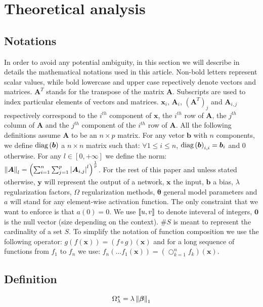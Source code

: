 \section{Theoretical analysis}

\subsection{Notations}

\par In order to avoid any potential ambiguity, in this section we will
describe in details the mathematical notations used in this article. Non-bold
letters represent scalar values, while bold lowercase and upper case
repectively denote vectors and matrices. $\bm{A}^T$ stands for the transpose of
the matrix $\bm{A}$. Subscripts are used to index particular elements of
vectors and matrices. $\bm{x}_i$, $\bm{A}_i$, $\left(\bm{A}^T\right)_j$ and
$\bm{A}_{i,j}$ respectively correspond to the $i^{th}$ component of $\bm{x}$,
the $i^{th}$ row of $\bm{A}$, the $j^{th}$ column of $\bm{A}$ and the $j^{th}$
component of the $i^{th}$ row of $\bm{A}$. All the following definitions assume
$\bm{A}$ to be an $n\times p$ matrix.  For any vetor $\bm{b}$ with $n$
components, we define $\text{diag}\left(\bm{b}\right)$ a $n\times n$ matrix such that: $\forall
1 \leq i \leq n$, $\text{diag}\left(\bm{b}\right)_{i, i} = \bm{b}_i$ and $0$ otherwise.  For any $l \in \left[0, +\infty\right]$ we define the norm: $\left\lVert\bm{A}\right\rVert_l =
\left(\sum_{i=1}^n \sum_{j=1}^p \left|\bm{A}_{i, j}\right|^l\right)^{\frac{1}{p}}$. For the rest of this paper and unless stated otherwise, $\bm{y}$ will represent the output of a network, $\bm{x}$ the input, $\bm{b}$ a bias, $\lambda$ regularization factors, $\Omega$ regularization methods, $\bm{\theta}$ general model parameters and $a$ will stand for any element-wise activation function. The only constraint that we want to enforce is that $a(0) = 0$. We use $\left\llbracket u, v\right\rrbracket$ to denote inteveral of integers, $\bm{0}$ is the null vector (size depending on the context). $\#S$ is meant to represent the cardinality of a set $S$. To simplify the notation of function composition we use the following operator: $g(f(\bm{x})) = (f \circ g)(\bm{x})$ and for a long sequence of functions from $f_1$ to $f_n$ we use: $f_n(...f_1(\bm{x})) = \left(\bigcirc_{k = 1}^n f_k\right)(\bm{x})$.
\subsection{Definition}

\begin{equation}
  \Omega_\lambda^s = \lambda \left\lVert\bm{\beta}\right\rVert_1
\end{equation}

